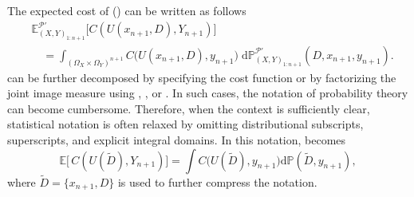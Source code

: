 \newpage
\begin{remark}
	\label{rem:notation}
	The expected cost of  () can be written as follows
	\begin{equation}
		\begin{split}
			&\mathbb{E}_{(X,Y)_{1\colon n+1}}^{\mathcal{P}'}\big[C(U(x_{n+1},D),Y_{n+1})\big] \\
			&\quad= \int_{(\Omega_X\times\Omega_Y)^{n+1}}
			C\big(U(x_{n+1},D),y_{n+1}\big)\;
			\mathrm{d}\mathbb{P}_{(X,Y)_{1\colon n+1}}^{\mathcal{P}'}(D,x_{n+1},y_{n+1}).
		\end{split}
		\label{eq:expcost2}
	\end{equation}
	 can be further decomposed by specifying the cost function or by factorizing the joint image measure using , , or . In such cases, the notation of probability theory can become cumbersome. Therefore, when the context is sufficiently clear, statistical notation is often relaxed by omitting distributional subscripts, superscripts, and explicit integral domains. In this notation,  becomes
	\begin{equation}
			\mathbb{E}\big[\,C(U(\tilde{D}) ,Y_{n+1})\big] = \int C\big(U(\tilde{D}),y_{n+1}\big) \mathrm{d}\mathbb{P}(\tilde{D},y_{n+1}),
		\label{eq:expcost3}
	\end{equation}	
	where $\tilde{D}= \{x_{n+1},D\}$ is used to further compress the notation.
\end{remark}

